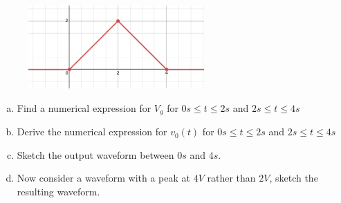 \documentclass[12pt]{article}
\begin{document}
\begin{figure}[!h]
  \centering 
  \includegraphics[clip,width=0.6\textwidth]{mid2_4a.png}
\end{figure}

\begin{enumerate}[(a)]
\item Find a numerical expression for $V_g$ for $0s \leq t \leq 2s$ and $2s \leq t \leq 4s$
\item Derive the numerical expression for $v_0(t)$ for $0s \leq t \leq 2s$ and $2s \leq t \leq 4s$
\item Sketch the output waveform between $0s$ and $4s$.
\item Now consider a waveform with a peak at $4V$ rather than $2V$, sketch the resulting waveform.
\end{enumerate}
\newpage
\end{document}
